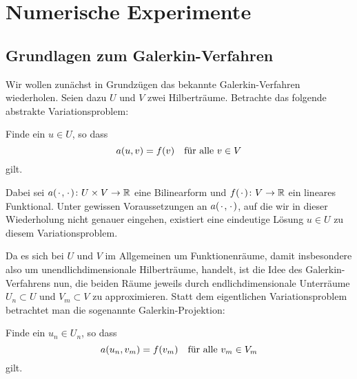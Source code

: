 
\chapter{Numerische Experimente} %
\label{cha:numerische_experimente}

\section{Grundlagen zum Galerkin-Verfahren} %
\label{sec:grundlagen_zum_galerkin_verfahren}

Wir wollen zunächst in Grundzügen das bekannte Galerkin-Verfahren wiederholen.
Seien dazu $U$ und $V$ zwei Hilberträume.
Betrachte das folgende abstrakte Variationsproblem:
\begin{Problem}
    Finde ein $u \in U$, so dass
    \begin{equation}
        a(u, v) = f(v) \quad \fa v \in V
    \end{equation}
    gilt.
\end{Problem}
Dabei sei $a(\blank, \blank) \colon U \times V \to \mathbb{R}$ eine Bilinearform und $f(\blank) \colon V \to \mathbb{R}$ ein lineares Funktional.
Unter gewissen Voraussetzungen an $a(\blank, \blank)$, auf die wir in dieser Wiederholung nicht genauer eingehen, existiert eine eindeutige Lösung $u \in U$ zu diesem Variationsproblem.

Da es sich bei $U$ und $V$ im Allgemeinen um Funktionenräume, damit insbesondere also um unendlichdimensionale Hilberträume, handelt, ist die Idee des Galerkin-Verfahrens nun, die beiden Räume jeweils durch endlichdimensionale Unterräume $U_{n} \subset U$ und $V_{m} \subset V$ zu approximieren.
Statt dem eigentlichen Variationsproblem betrachtet man die sogenannte Galerkin-Projektion:
\begin{Problem}
    Finde ein $u_{n} \in U_{n}$, so dass
    \begin{equation}
        a(u_{n}, v_{m}) = f(v_{m}) \quad \fa v_{m} \in V_{m}
    \end{equation}
    gilt.
\end{Problem}

